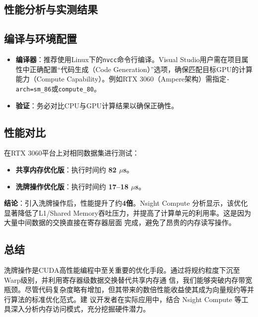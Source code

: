\subsection{性能分析与实测结果}

\subsection{编译与环境配置}
\begin{itemize}
    \item \textbf{编译器}：推荐使用Linux下的\texttt{nvcc}命令行编译。Visual Studio用户需在项目属性中正确配置“代码生成（Code Generation）”选项，确保匹配目标GPU的计算能力（Compute Capability）。例如RTX 3060（Ampere架构）需指定\texttt{-arch=sm\_86}或\texttt{compute\_80}。
    \item \textbf{验证}：务必对比CPU与GPU计算结果以确保正确性。
\end{itemize}

\subsection{性能对比}
在RTX 3060平台上对相同数据集进行测试：
\begin{itemize}
    \item \textbf{共享内存优化版}：执行时间约 \textbf{82 $\mu$s}。
    \item \textbf{洗牌操作优化版}：执行时间约 \textbf{17--18 $\mu$s}。
\end{itemize}

\textbf{结论}：引入洗牌操作后，性能提升了约\textbf{4倍}。Nsight Compute 分析显示，该优化
显著降低了L1/Shared Memory吞吐压力，并提高了计算单元的利用率。这是因为大量中间数据的交换直接在寄存器层面
完成，避免了昂贵的内存读写操作。

\subsection{总结}
洗牌操作是CUDA高性能编程中至关重要的优化手段。通过将规约粒度下沉至Warp级别，并利用寄存器级数据交换替代共享内存通
信，我们能够突破内存带宽瓶颈。尽管代码复杂度略有增加，但其带来的数倍性能收益使其成为向量规约等并行算法的标准优化范式。建
议开发者在实际应用中，结合 Nsight Compute 等工具深入分析内存访问模式，充分挖掘硬件潜力。


